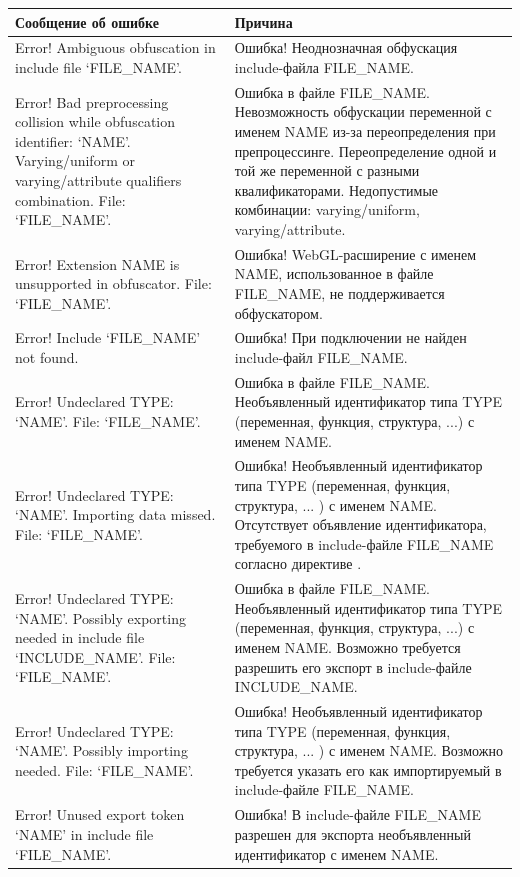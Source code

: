 \documentclass[a4paper,12pt,oneside]{sphinxmanual}
\begin{document}
\begin{tabulary}{\linewidth}{|L|L|}
\hline
\textsf{\relax 
Сообщение об ошибке
} & \textsf{\relax 
Причина
}\\
\hline
Error! Ambiguous obfuscation in
include file `FILE\_NAME'.
 & 
Ошибка! Неоднозначная обфускация
include-файла FILE\_NAME.
\\

Error! Bad preprocessing collision
while obfuscation identifier:
`NAME'. Varying/uniform or
varying/attribute qualifiers
combination. File: `FILE\_NAME'.
 & 
Ошибка в файле FILE\_NAME. Невозможность
обфускации переменной с именем NAME из-за
переопределения при препроцессинге.
Переопределение одной и той же переменной
с разными квалификаторами. Недопустимые
комбинации: varying/uniform,
varying/attribute.
\\

Error! Extension NAME is
unsupported in obfuscator. File:
`FILE\_NAME'.
 & 
Ошибка! WebGL-расширение с именем NAME,
использованное в файле FILE\_NAME, не
поддерживается обфускатором.
\\

Error! Include `FILE\_NAME' not
found.
 & 
Ошибка! При подключении не найден
include-файл FILE\_NAME.
\\

Error! Undeclared TYPE: `NAME'.
File: `FILE\_NAME'.
 & 
Ошибка в файле FILE\_NAME. Необъявленный
идентификатор типа TYPE (переменная,
функция, структура, ...) с именем NAME.
\\

Error! Undeclared TYPE: `NAME'.
Importing data missed. File:
`FILE\_NAME'.
 & 
Ошибка! Необъявленный идентификатор типа
TYPE (переменная, функция, структура, ...
) с именем NAME. Отсутствует объявление
идентификатора, требуемого в
include-файле FILE\_NAME согласно
директиве .
\\

Error! Undeclared TYPE: `NAME'.
Possibly exporting needed in
include file `INCLUDE\_NAME'. File:
`FILE\_NAME'.
 & 
Ошибка в файле FILE\_NAME. Необъявленный
идентификатор типа TYPE (переменная,
функция, структура, ...) с именем NAME.
Возможно требуется разрешить его экспорт
в include-файле INCLUDE\_NAME.
\\

Error! Undeclared TYPE: `NAME'.
Possibly importing needed. File:
`FILE\_NAME'.
 & 
Ошибка! Необъявленный идентификатор типа
TYPE (переменная, функция, структура, ...
) с именем NAME. Возможно требуется
указать его как импортируемый в
include-файле FILE\_NAME.
\\

Error! Unused export token `NAME'
in include file `FILE\_NAME'.
 & 
Ошибка! В include-файле FILE\_NAME
разрешен для экспорта необъявленный
идентификатор с именем NAME.
\\
\hline\end{tabulary}
\end{document}
